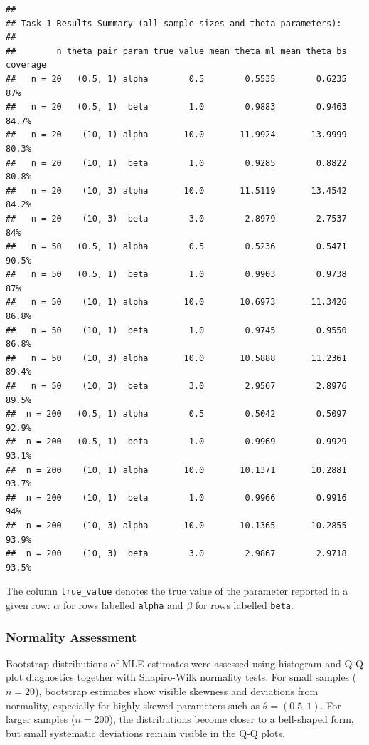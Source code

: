 \documentclass[12pt, a4paper]{article}\usepackage[]{graphicx}\usepackage[]{xcolor}
\makeatletter
\newenvironment{kframe}{%
 \def\at@end@of@kframe{}%
 \ifinner\ifhmode%
  \def\at@end@of@kframe{\end{minipage}}%
  \begin{minipage}{\columnwidth}%
 \fi\fi%
 \def\FrameCommand##1{\hskip\@totalleftmargin \hskip-\fboxsep
 \colorbox{shadecolor}{##1}\hskip-\fboxsep
     \hskip-\linewidth \hskip-\@totalleftmargin \hskip\columnwidth}%
 \MakeFramed {\advance\hsize-\width
   \@totalleftmargin\z@ \linewidth\hsize
   \@setminipage}}%
 {\par\unskip\endMakeFramed%
 \at@end@of@kframe}
\newenvironment{knitrout}{}{} %
\makeatother
\begin{document}
\begin{knitrout}
\color{fgcolor}\begin{kframe}
\begin{verbatim}
## 
## Task 1 Results Summary (all sample sizes and theta parameters):
## 
##        n theta_pair param true_value mean_theta_ml mean_theta_bs coverage
##   n = 20   (0.5, 1) alpha        0.5        0.5535        0.6235      87%
##   n = 20   (0.5, 1)  beta        1.0        0.9883        0.9463    84.7%
##   n = 20    (10, 1) alpha       10.0       11.9924       13.9999    80.3%
##   n = 20    (10, 1)  beta        1.0        0.9285        0.8822    80.8%
##   n = 20    (10, 3) alpha       10.0       11.5119       13.4542    84.2%
##   n = 20    (10, 3)  beta        3.0        2.8979        2.7537      84%
##   n = 50   (0.5, 1) alpha        0.5        0.5236        0.5471    90.5%
##   n = 50   (0.5, 1)  beta        1.0        0.9903        0.9738      87%
##   n = 50    (10, 1) alpha       10.0       10.6973       11.3426    86.8%
##   n = 50    (10, 1)  beta        1.0        0.9745        0.9550    86.8%
##   n = 50    (10, 3) alpha       10.0       10.5888       11.2361    89.4%
##   n = 50    (10, 3)  beta        3.0        2.9567        2.8976    89.5%
##  n = 200   (0.5, 1) alpha        0.5        0.5042        0.5097    92.9%
##  n = 200   (0.5, 1)  beta        1.0        0.9969        0.9929    93.1%
##  n = 200    (10, 1) alpha       10.0       10.1371       10.2881    93.7%
##  n = 200    (10, 1)  beta        1.0        0.9966        0.9916      94%
##  n = 200    (10, 3) alpha       10.0       10.1365       10.2855    93.9%
##  n = 200    (10, 3)  beta        3.0        2.9867        2.9718    93.5%
\end{verbatim}
\end{kframe}
\end{knitrout}

The column \texttt{true\_value} denotes the true value of the parameter reported in a given row: $\alpha$ for rows labelled \texttt{alpha} and $\beta$ for rows labelled \texttt{beta}.

\subsubsection{Normality Assessment}

Bootstrap distributions of MLE estimates were assessed using histogram and Q-Q plot diagnostics together with Shapiro-Wilk normality tests. For small samples ($n=20$), bootstrap estimates show visible skewness and deviations from normality, especially for highly skewed parameters such as $\theta=(0.5,1)$. For larger samples ($n=200$), the distributions become closer to a bell-shaped form, but small systematic deviations remain visible in the Q-Q plots.
\end{document}
